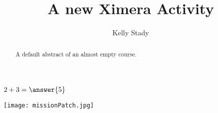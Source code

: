 \documentclass{ximera}
\title{A new Ximera Activity}
\author{Kelly Stady}
\begin{document}
\begin{abstract}
    A default abstract of an almost empty course.
\end{abstract}
\maketitle


\begin{exercise}
    $2+3=\answer{5}$
\end{exercise}

\begin{center} %
\texttt{[image: missionPatch.jpg]}
\end{center}
\end{document}
